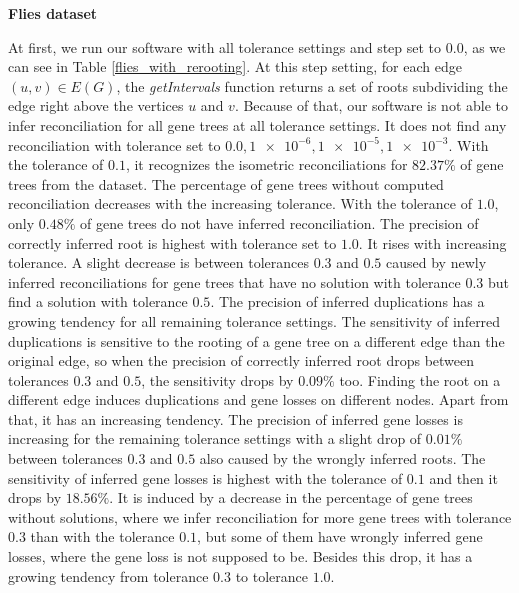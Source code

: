 \noindent \textbf{Flies dataset}

At first, we run our software with all tolerance settings and step set to $0.0$, as we can see in Table \ref{flies_with_rerooting}. At this step setting, for each edge $(u, v) \in E(G)$, the \emph{getIntervals} function returns a set of roots subdividing the edge right above the vertices $u$ and $v$. Because of that, our software is not able to infer reconciliation for all gene trees at all tolerance settings. It does not find any reconciliation with tolerance set to $0.0, \num{1e-6}, \num{1e-5}, \num{1e-3}$. With the tolerance of $0.1$, it recognizes the isometric reconciliations for $82.37\%$ of gene trees from the dataset. The percentage of gene trees without computed reconciliation decreases with the increasing tolerance. With the tolerance of $1.0$, only $0.48\%$ of gene trees do not have inferred reconciliation. The precision of correctly inferred root is highest with tolerance set to $1.0$. It rises with increasing tolerance. A slight decrease is between tolerances $0.3$ and $0.5$ caused by newly inferred reconciliations for gene trees that have no solution with tolerance $0.3$ but find a solution with tolerance $0.5$. The precision of inferred duplications has a growing tendency for all remaining tolerance settings. The sensitivity of inferred duplications is sensitive to the rooting of a gene tree on a different edge than the original edge, so when the precision of correctly inferred root drops between tolerances $0.3$ and $0.5$, the sensitivity drops by $0.09\%$ too. Finding the root on a different edge induces duplications and gene losses on different nodes. Apart from that, it has an increasing tendency. The precision of inferred gene losses is increasing for the remaining tolerance settings with a slight drop of $0.01\%$ between tolerances $0.3$ and $0.5$ also caused by the wrongly inferred roots. The sensitivity of inferred gene losses is highest with the tolerance of $0.1$ and then it drops by $18.56\%$. It is induced by a decrease in the percentage of gene trees without solutions, where we infer reconciliation for more gene trees with tolerance $0.3$ than with the tolerance $0.1$, but some of them have wrongly inferred gene losses, where the gene loss is not supposed to be. Besides this drop, it has a growing tendency from tolerance $0.3$ to tolerance $1.0$.

